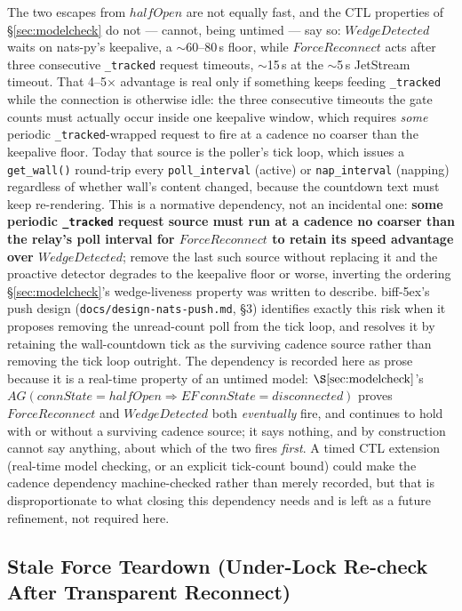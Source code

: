 \documentclass[a4paper,10pt,fleqn]{article}
\begin{document}
The two escapes from $halfOpen$ are not equally fast, and the CTL
properties of \S\ref{sec:modelcheck} do not --- cannot, being untimed ---
say so: $WedgeDetected$ waits on nats-py's keepalive, a $\sim$60--80\,s
floor, while $ForceReconnect$ acts after three consecutive
\texttt{\_tracked} request timeouts, $\sim$15\,s at the $\sim$5\,s
JetStream timeout.  That 4--5$\times$ advantage is real only if something
keeps feeding \texttt{\_tracked} while the connection is otherwise idle:
the three consecutive timeouts the gate counts must actually occur inside
one keepalive window, which requires \emph{some} periodic
\texttt{\_tracked}-wrapped request to fire at a cadence no coarser than
the keepalive floor.  Today that source is the poller's tick loop, which
issues a \texttt{get\_wall()} round-trip every \texttt{poll\_interval}
(active) or \texttt{nap\_interval} (napping) regardless of whether wall's
content changed, because the countdown text must keep re-rendering.  This
is a normative dependency, not an incidental one: \textbf{some periodic
\texttt{\_tracked} request source must run at a cadence no coarser than
the relay's poll interval for $ForceReconnect$ to retain its speed
advantage over $WedgeDetected$}; remove the last such source without
replacing it and the proactive detector degrades to the keepalive floor or
worse, inverting the ordering \S\ref{sec:modelcheck}'s wedge-liveness
property was written to describe.  biff-5ex's push design
(\texttt{docs/design-nats-push.md}, \S3) identifies exactly this risk when
it proposes removing the unread-count poll from the tick loop, and
resolves it by retaining the wall-countdown tick as the surviving cadence
source rather than removing the tick loop outright.  The dependency is
recorded here as prose because it is a real-time property of an untimed
model: $\S\ref{sec:modelcheck}$'s $AG(connState = halfOpen \Rightarrow
EF\,connState = disconnected)$ proves $ForceReconnect$ and $WedgeDetected$
both \emph{eventually} fire, and continues to hold with or without a
surviving cadence source; it says nothing, and by construction cannot say
anything, about which of the two fires \emph{first}.  A timed CTL
extension (real-time model checking, or an explicit tick-count bound) could
make the cadence dependency machine-checked rather than merely recorded,
but that is disproportionate to what closing this dependency needs and is
left as a future refinement, not required here.

\subsection{Stale Force Teardown (Under-Lock Re-check After Transparent
Reconnect)}
\end{document}
